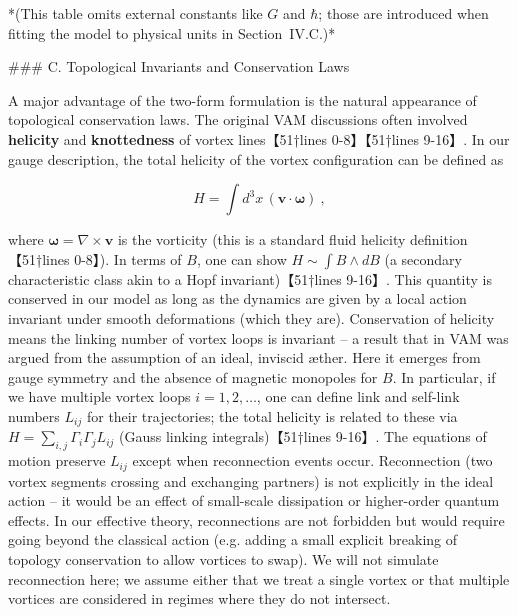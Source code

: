 \documentclass[12pt]{article}
\begin{document}
*(This table omits external constants like $G$ and $\hbar$; those are introduced when fitting the model to physical units in Section IV.C.)*

### C. Topological Invariants and Conservation Laws

A major advantage of the two-form formulation is the natural appearance of topological conservation laws. The original VAM discussions often involved \textbf{helicity} and \textbf{knottedness} of vortex lines【51†lines 0-8】【51†lines 9-16】. In our gauge description, the total helicity of the vortex configuration can be defined as

\[ H = \int d^3x\, (\mathbf{v}\cdot \mathbf{\omega})~, \] 

where $\mathbf{\omega} = \nabla \times \mathbf{v}$ is the vorticity (this is a standard fluid helicity definition【51†lines 0-8】). In terms of $B$, one can show $H \sim \int B \wedge dB$ (a secondary characteristic class akin to a Hopf invariant)【51†lines 9-16】. This quantity is conserved in our model as long as the dynamics are given by a local action invariant under smooth deformations (which they are). Conservation of helicity means the linking number of vortex loops is invariant – a result that in VAM was argued from the assumption of an ideal, inviscid æther. Here it emerges from gauge symmetry and the absence of magnetic monopoles for $B$. In particular, if we have multiple vortex loops $i=1,2,\dots$, one can define link and self-link numbers $L_{ij}$ for their trajectories; the total helicity is related to these via $H = \sum_{i,j} \Gamma_i \Gamma_j L_{ij}$ (Gauss linking integrals)【51†lines 9-16】. The equations of motion preserve $L_{ij}$ except when reconnection events occur. Reconnection (two vortex segments crossing and exchanging partners) is not explicitly in the ideal action – it would be an effect of small-scale dissipation or higher-order quantum effects. In our effective theory, reconnections are not forbidden but would require going beyond the classical action (e.g. adding a small explicit breaking of topology conservation to allow vortices to swap). We will not simulate reconnection here; we assume either that we treat a single vortex or that multiple vortices are considered in regimes where they do not intersect. 
\end{document}
